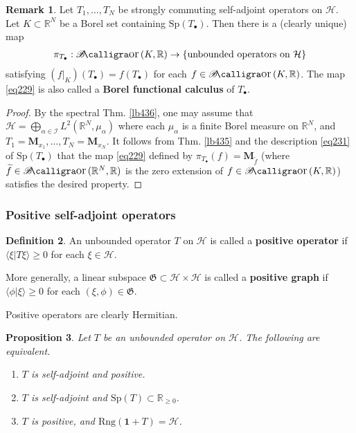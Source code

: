 \documentclass[12pt,b5paper,notitlepage]{article}
\theoremstyle{definition}
\newtheorem{df}{Definition}[subsection]
\newtheorem{rem}[df]{Remark}
\theoremstyle{plain}
\newtheorem{pp}[df]{Proposition}
\DeclareMathOperator{\Bor}{\mathscr{B}\text{\kern -2pt {\calligra\large or}}\,}
\newcommand{\fk}{\mathfrak}
\newcommand{\wtd}{\widetilde}
\newcommand{\idt}{\mathbf{1}}
\newcommand{\bk}[1]{\langle {#1}\rangle}
\newcommand{\blt}{\bullet}
\newcommand{\Rbb}{\mathbb R}
\newcommand{\Sp}{\mathrm{Sp}}
\newcommand{\Rng}{\mathrm{Rng}}
\newcommand{\MH}{\mathcal H}
\newcommand{\SI}{\mathscr I}
\newcommand{\Mbf}{\mathbf M}
\newcommand{\hqed}{\hfill\qedsymbol}
\numberwithin{equation}{section}
\begin{document}
\begin{rem}
Let $T_1,\dots,T_N$ be strongly commuting self-adjoint operators on $\MH$. Let $K\subset\Rbb^N$ be a Borel set containing $\Sp(T_\blt)$. Then there is a (clearly unique) map
\begin{align}\label{eq229}
\pi_{T_\blt}:\Bor(K,\Rbb)\rightarrow\{\text{unbounded operators on }\MH\}
\end{align}
satisfying $(f|_K)(T_\blt)=f(T_\blt)$ for each $f\in\Bor(K,\Rbb)$. The map \eqref{eq229} is also called a \textbf{Borel functional calculus}  of $T_\blt$.
\end{rem}

\begin{proof}
By the spectral Thm. \ref{lb436}, one may assume that $\MH=\bigoplus_{\alpha\in\SI}L^2(\Rbb^N,\mu_\alpha)$ where each $\mu_\alpha$ is a finite Borel measure on $\Rbb^N$, and $T_1=\Mbf_{x_1},\dots,T_N=\Mbf_{x_N}$. It follows from Thm. \ref{lb435} and the description \eqref{eq231} of $\Sp(T_\blt)$ that the map \eqref{eq229} defined by $\pi_{T_\blt}(f)=\Mbf_{\wtd f}$ (where $\wtd f\in\Bor(\Rbb^N,\Rbb)$ is the zero extension of $f\in\Bor(K,\Rbb)$) satisfies the desired property.
\end{proof}


\subsubsection{Positive self-adjoint operators}



\begin{df}
An unbounded operator $T$ on $\MH$ is called a \textbf{positive operator}  if $\bk{\xi|T\xi}\geq0$ for each $\xi\in\MH$. 

More generally, a linear subspace $\fk G\subset\MH\times\MH$ is called a \textbf{positive graph}  if $\bk{\phi|\xi}\geq0$ for each $(\xi,\phi)\in\fk G$.  \hqed
\end{df}

Positive operators are clearly Hermitian.


\begin{pp}
Let $T$ be an unbounded operator on $\MH$. The following are equivalent.
\begin{enumerate}[label=(\arabic*)]
\item $T$ is self-adjoint and positive.
\item $T$ is self-adjoint and $\Sp(T)\subset\Rbb_{\geq0}$.
\item $T$ is positive, and $\Rng(\idt+T)=\MH$.
\end{enumerate}
\end{pp}
\end{document}
